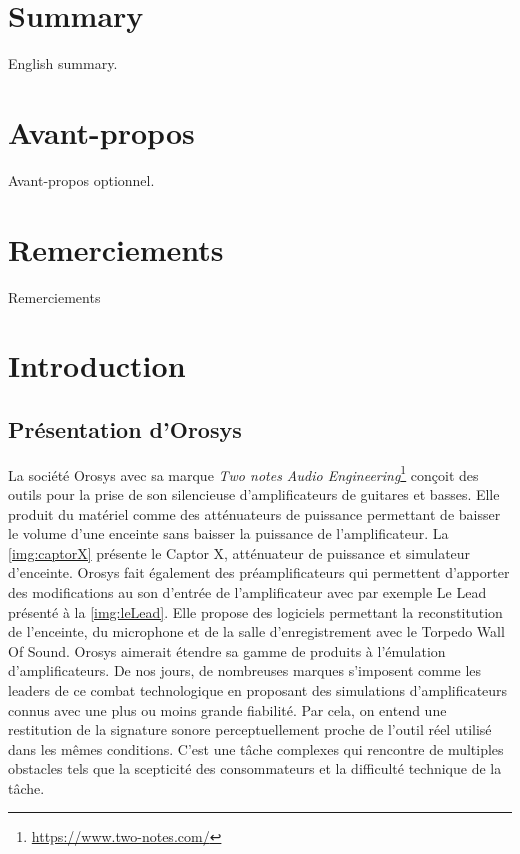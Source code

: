 \documentclass[a4paper]{article}
\begin{document}
\newpage
\section*{Summary}

English summary.

\newpage
\section*{Avant-propos}

Avant-propos optionnel.

\newpage
\section*{Remerciements}

Remerciements

\newpage
\begingroup
{}
\thispagestyle{empty}
\tableofcontents
\thispagestyle{empty}
\endgroup

\newpage
\section{Introduction}
\subsection{Présentation d'Orosys}

La société Orosys avec sa marque \textit{Two notes Audio Engineering}\footnote{\url{https://www.two-notes.com/}} conçoit des outils pour la prise de son silencieuse d’amplificateurs de guitares et basses.
Elle produit du matériel comme des atténuateurs de puissance permettant de baisser le volume d'une enceinte sans baisser la puissance de l'amplificateur.
La \autoref{img:captorX} présente le Captor X, atténuateur de puissance et simulateur d'enceinte.
Orosys fait également des préamplificateurs qui permettent d'apporter des modifications au son d'entrée de l'amplificateur avec par exemple Le Lead présenté à la \autoref{img:leLead}.
Elle propose des logiciels permettant la reconstitution de l’enceinte, du microphone et de la salle d’enregistrement avec le Torpedo Wall Of Sound.
Orosys aimerait étendre sa gamme de produits à l’émulation d’amplificateurs.
De nos jours, de nombreuses marques s’imposent comme les leaders de ce combat technologique en proposant des simulations d'amplificateurs connus avec une plus ou moins grande fiabilité.
Par cela, on entend une restitution de la signature sonore perceptuellement proche de l’outil réel utilisé dans les mêmes conditions.
C’est une tâche complexes qui rencontre de multiples obstacles tels que la scepticité des consommateurs et la difficulté technique de la tâche.
\end{document}
